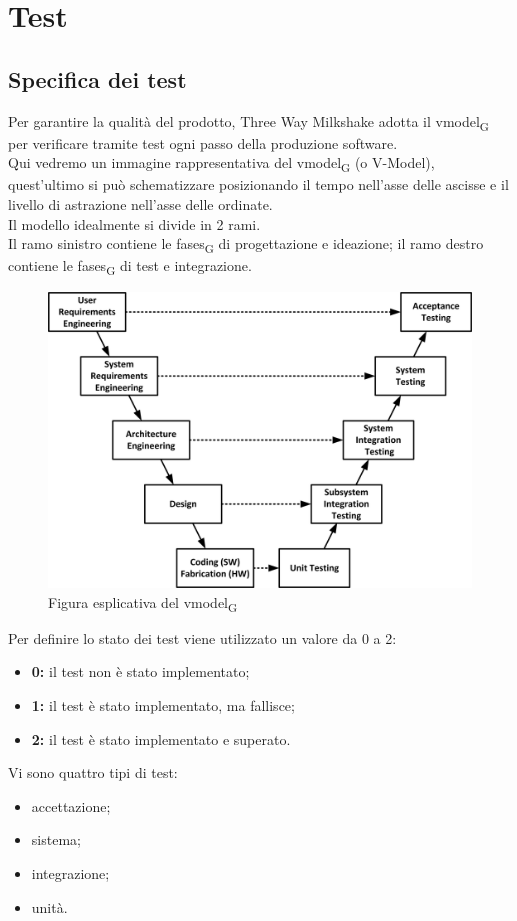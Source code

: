 \section{Test}

\subsection{Specifica dei test}

Per garantire la qualità del prodotto, Three Way Milkshake adotta il \gls{vmodel}\textsubscript{G} per verificare tramite test ogni passo della produzione software.\\Qui vedremo un immagine rappresentativa del \gls{vmodel}\textsubscript{G} (o V-Model), quest'ultimo si può schematizzare posizionando il tempo nell'asse delle ascisse e il livello di astrazione nell'asse delle ordinate.\\Il modello idealmente si divide in 2 rami.\\Il ramo sinistro contiene le \glspl{fase}\textsubscript{G} di progettazione e ideazione; il ramo destro contiene le \glspl{fase}\textsubscript{G} di test e integrazione.
\begin{figure}[h!]
	\centering
	\includegraphics[scale=0.6]{res/images/v_model.jpg}
	\caption{Figura esplicativa del \gls{vmodel}\textsubscript{G}}
\end{figure}

Per definire lo stato dei test viene utilizzato un valore da 0 a 2:
\begin{itemize}
	\item \textbf{0:} il test non è stato implementato;
	\item \textbf{1:} il test è stato implementato, ma fallisce;
	\item \textbf{2:} il test è stato implementato e superato.
\end{itemize}
Vi sono quattro tipi di test:
\begin{itemize}
	\item accettazione;
	\item sistema;
	\item integrazione;
	\item unità.
\end{itemize}

